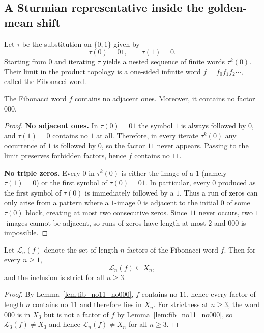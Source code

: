 \subsection{A Sturmian representative inside the golden-mean shift}
\label{app:fib_word_in_gm_shift}
\begin{definition}
\label{def:fibonacci_word}
Let $\tau$ be the substitution on $\{0,1\}$ given by
\[
\tau(0)=01,\qquad \tau(1)=0.
\]
Starting from $0$ and iterating $\tau$ yields a nested sequence of finite
words $\tau^k(0)$.
Their limit in the product topology is a one-sided infinite word
$f=f_0 f_1 f_2\cdots$, called the Fibonacci word.
\end{definition}

\begin{lemma}
\label{lem:fib_no11_no000}
The Fibonacci word $f$ contains no adjacent ones.
Moreover, it contains no factor $000$.
\end{lemma}
\begin{proof}
\textbf{No adjacent ones.}
In $\tau(0)=01$ the symbol $1$ is always followed by $0$, and $\tau(1)=0$
contains no $1$ at all.
Therefore, in every iterate $\tau^k(0)$ any occurrence of $1$ is followed by
$0$, so the factor $11$ never appears.
Passing to the limit preserves forbidden factors, hence $f$ contains no $11$.

\medskip
\noindent\textbf{No triple zeros.}
Every $0$ in $\tau^k(0)$ is either the image of a $1$ (namely $\tau(1)=0$) or
the first symbol of $\tau(0)=01$.
In particular, every $0$ produced as the first symbol of $\tau(0)$ is
immediately followed by a $1$.
Thus a run of zeros can only arise from a pattern where a $1$-image $0$
is adjacent to the initial $0$ of some $\tau(0)$ block, creating at most
two consecutive zeros.
Since $11$ never occurs, two $1$-images cannot be adjacent, so runs of zeros
have length at most $2$ and $000$ is impossible.
\end{proof}

\begin{corollary}
\label{cor:sturmian_language_strict_subset}
Let $\mathcal{L}_n(f)$ denote the set of length-$n$ factors of the Fibonacci
word $f$.
Then for every $n\ge 1$,
\[
\mathcal{L}_n(f)\subseteq X_n,
\]
and the inclusion is strict for all $n\ge 3$.
\end{corollary}
\begin{proof}
By Lemma~\ref{lem:fib_no11_no000}, $f$ contains no $11$, hence every factor of
length $n$ contains no $11$ and therefore lies in $X_n$.
For strictness at $n\ge 3$, the word $000$ is in $X_3$ but is not a factor of
$f$ by Lemma~\ref{lem:fib_no11_no000}, so $\mathcal{L}_3(f)\neq X_3$ and hence
$\mathcal{L}_n(f)\neq X_n$ for all $n\ge 3$.
\end{proof}

